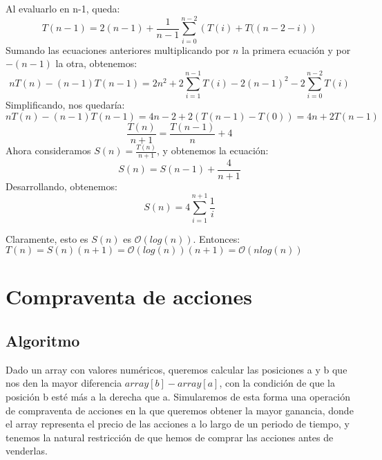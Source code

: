\documentclass[a4paper, 11pt]{article} %
\begin{document}
      Al evaluarlo en n-1, queda:
      \begin{equation}
      	T(n-1) = 2(n-1) + \frac{1}{n-1}\sum_{i=0}^{n-2}\left(T(i) + T((n-2-i) \right)
      \end{equation}
      Sumando las ecuaciones anteriores multiplicando por $n$ la primera ecuación y por $-(n-1)$ la otra, obtenemos:
      \begin{equation}
        nT(n) - (n-1)T(n-1) = 2n^2 + 2\sum^{n-1}_{i=1} T(i) - 2(n-1)^2 - 2\sum_{i=0}^{n-2}T(i)
      \end{equation}
      Simplificando, nos quedaría:
	  \begin{equation}
	    nT(n) - (n-1)T(n-1) = 4n-2 + 2(T(n-1) - T(0)) = 4n + 2T(n-1) 
	  \end{equation}
	  \begin{equation}
	    \frac{T(n)}{n+1} = \frac{T(n-1)}{n} + 4
	  \end{equation}
      Ahora consideramos $S(n) = \frac{T(n)}{n+1}$, y obtenemos la ecuación:
      \begin{equation}
        S(n) = S(n-1) + \frac{4}{n+1}
      \end{equation}
      Desarrollando, obtenemos:
      \begin{equation}
        S(n) = 4 \sum^{n+1}_{i=1} \frac{1}{i}
      \end{equation}
      
      Claramente, esto es $S(n)$ es $\mathcal{O}(log(n))$. Entonces: \\
      $T(n) = S(n) (n+1) = \mathcal{O}(log(n)) (n+1) = \mathcal{O}(nlog(n))$

\section {Compraventa de acciones}
\subsection{Algoritmo}
	Dado un array con valores numéricos, queremos calcular las posiciones a y b que nos den la mayor diferencia $array[b]-array[a]$, con la condición de que la posición b esté más a la derecha que a.
	Simularemos de esta forma una operación de compraventa de acciones en la que queremos obtener la mayor ganancia, donde el array representa el precio de las acciones a lo largo de un periodo de tiempo, y tenemos la natural restricción de que hemos de comprar las acciones antes de venderlas. 
	
\end{document}
